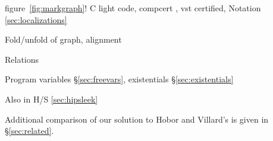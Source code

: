\makeatletter
\newlength{\@mli}
\newcommand{\mli}[1]{%
  \settowidth{\@mli}{\lstinline/#1/}
  \hspace{-.5ex}\begin{minipage}[t]{\@mli}\lstinline/#1/\end{minipage}}
\makeatother
\newcommand{\li}[1]{\ifmmode\mbox{\mli{#1}}\else\mbox{\lstinline/#1/}\fi}

\newcommand{\tx}[1]{\text{#1}}
\newcommand{\p}[1]{\ensuremath{\mathsf{#1}}} %
\newcommand{\m}[1]{\ensuremath{\mathit{#1}}} %
\let\ramify\lightning
\newcommand{\infrulestyle}[1]{\textsc{#1}}
\newcommand{\infrule}[4]{\inferrule*[lab={\infrulestyle{#1}},right=$\mathrlap{#4}$]{#2}{#3}}
\newcommand{\RuleS}[4]{\infrulestyle{#1}\frac{#2}{#3} \textit{#4}}
\newcommand{\Rule}[3]{\[\RuleS{#1}{\begin{array}{c} #2 \end{array}}{#3}{}\]}
\newcommand{\MV}{\ensuremath{\mathsf{ModVar}}}
\newcommand{\FV}{\ensuremath{\mathsf{FreeVar}}}
\newcommand{\pguards}[1]{\llbracket #1 \rrbracket}



figure~\ref{fig:markgraph}! C light code, compcert \cite{leroy:compcert}, vst \cite{appel:programlogics} certified, 
Notation \ref{sec:localizations}

Fold/unfold of graph, alignment

Relations

Program variables \S\ref{sec:freevars}, existentials \S\ref{sec:existentials}

Also in H/S \ref{sec:hipsleek}


{\color{magenta} Additional comparison of our solution to Hobor and Villard's is given in \S\ref{sec:related}.}

